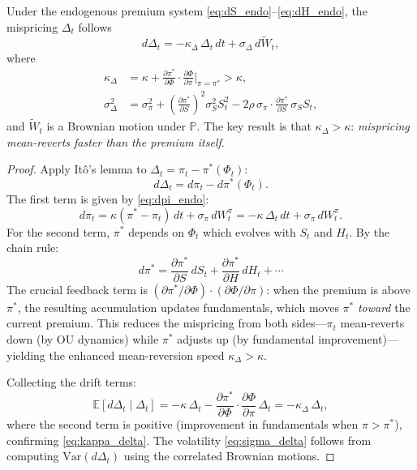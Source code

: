 \begin{theorem}\label{thm:mispricing_dynamics}
Under the endogenous premium system
\eqref{eq:dS_endo}--\eqref{eq:dH_endo}, the mispricing $\Delta_t$ follows
\begin{equation}\label{eq:d_delta}
  d\Delta_t = -\kappa_\Delta\, \Delta_t\, dt
  + \sigma_\Delta\, d\tilde{W}_t,
\end{equation}
where
\begin{align}
  \kappa_\Delta &= \kappa + \frac{\partial \pi^*}{\partial \Phi}
    \cdot \frac{\partial \Phi}{\partial \pi}\bigg|_{\pi = \pi^*}
    > \kappa,
    \label{eq:kappa_delta} \\[4pt]
  \sigma_\Delta^2 &= \sigma_\pi^2
    + \left(\frac{\partial \pi^*}{\partial S}\right)^2 \sigma_S^2 S_t^2
    - 2\rho\, \sigma_\pi \cdot \frac{\partial \pi^*}{\partial S}\,
    \sigma_S S_t,
    \label{eq:sigma_delta}
\end{align}
and $\tilde{W}_t$ is a Brownian motion under $\mathbb{P}$.  The key result
is that $\kappa_\Delta > \kappa$: \emph{mispricing mean-reverts faster than
the premium itself}.
\end{theorem}

\begin{proof}
Apply It\^{o}'s lemma to $\Delta_t = \pi_t - \pi^*(\Phi_t)$:
\begin{equation}\label{eq:ito_delta}
  d\Delta_t = d\pi_t - d\pi^*(\Phi_t).
\end{equation}
The first term is given by \eqref{eq:dpi_endo}:
\[
  d\pi_t = \kappa(\pi^* - \pi_t)\,dt + \sigma_\pi\,dW_t^\pi
  = -\kappa\,\Delta_t\,dt + \sigma_\pi\,dW_t^\pi.
\]
For the second term, $\pi^*$ depends on $\Phi_t$ which evolves with
$S_t$ and $H_t$.  By the chain rule:
\[
  d\pi^* = \frac{\partial \pi^*}{\partial S}\,dS_t
  + \frac{\partial \pi^*}{\partial H}\,dH_t + \cdots
\]
The crucial feedback term is $(\partial\pi^*/\partial\Phi) \cdot
(\partial\Phi/\partial\pi)$: when the premium is above $\pi^*$, the
resulting accumulation updates fundamentals, which moves $\pi^*$
\emph{toward} the current premium.  This reduces the mispricing from both
sides---$\pi_t$ mean-reverts down (by OU dynamics) while $\pi^*$ adjusts up
(by fundamental improvement)---yielding the enhanced mean-reversion speed
$\kappa_\Delta > \kappa$.

Collecting the drift terms:
\[
  \mathbb{E}[d\Delta_t \mid \Delta_t]
  = -\kappa\,\Delta_t - \frac{\partial\pi^*}{\partial\Phi}
  \cdot \frac{\partial\Phi}{\partial\pi}\,\Delta_t
  = -\kappa_\Delta\,\Delta_t,
\]
where the second term is positive (improvement in fundamentals when $\pi >
\pi^*$), confirming \eqref{eq:kappa_delta}.  The volatility
\eqref{eq:sigma_delta} follows from computing $\mathrm{Var}(d\Delta_t)$
using the correlated Brownian motions.
\end{proof}

